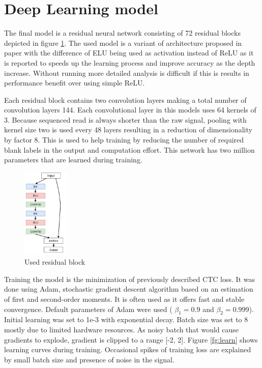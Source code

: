\documentclass[times, utf8, diplomski, numeric, english]{fer}
\begin{document}
\section{Deep Learning model}

The final model is a residual neural network consisting of 72 residual blocks depicted in figure \ref{fg:model_block}. The used model is a variant of architecture proposed in paper \cite{identitet} with the difference of ELU being used as activation instead of ReLU as it is reported\cite{resnet-elu} to speeds up the learning process and improve accuracy as the depth increase. 
Without running more detailed analysis is difficult if this is results in performance benefit over using simple ReLU.

Each residual block contains two convolution layers making a total number of convolution layers 144. Each convolutional layer in this models uses 64 kernels of 3. Because sequenced read is always shorter than the raw signal, pooling with kernel size two is used every 48 layers resulting in a reduction of dimensionality by factor 8. This is used to help training by reducing the number of required blank labels in the output and computation effort. This network has two million parameters that are learned during training. 


\begin{figure}[!ht]
	\begin{center}
		\includegraphics[width=0.2\textwidth]{./imgs/model.png}
		\caption{Used residual block}
		\label{fg:model_block}
	\end{center}
\end{figure}


Training the model is the minimization of previously described CTC loss. It was done using Adam\cite{adam}, stochastic gradient descent algorithm based on an estimation of first and second-order moments.
It is often used as it offers fast and stable convergence. Default parameters of Adam were used (
$\beta_1=0.9$ and $\beta_2=0.999$). Initial learning was set to 1e-3 with exponential decay. Batch size was set to 8 mostly due to limited hardware resources. As noisy batch that would cause gradients to explode, gradient is clipped to a range [-2, 2].
Figure \ref{fg:learn} shows learning curves during training. Occasional spikes of training loss are explained by small batch size and presence of noise in the signal. 
\end{document}
